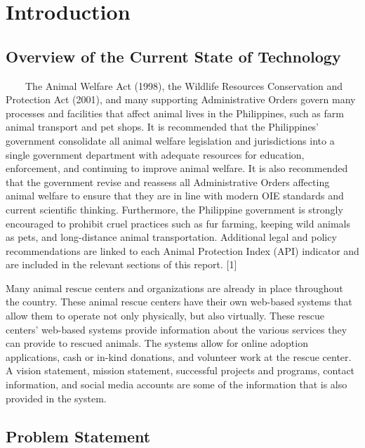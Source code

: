 \chapter{Introduction}
\label{sec:researchdesc}    %

\section{Overview of the Current State of Technology}
\label{sec:overview}

~~~~The Animal Welfare Act (1998), the Wildlife Resources Conservation and Protection Act (2001), and many supporting Administrative Orders govern many processes and facilities that affect animal lives in the Philippines, such as farm animal transport and pet shops. It is recommended that the Philippines' government consolidate all animal welfare legislation and jurisdictions into a single government department with adequate resources for education, enforcement, and continuing to improve animal welfare. It is also recommended that the government revise and reassess all Administrative Orders affecting animal welfare to ensure that they are in line with modern OIE standards and current scientific thinking. Furthermore, the Philippine government is strongly encouraged to prohibit cruel practices such as fur farming, keeping wild animals as pets, and long-distance animal transportation. Additional legal and policy recommendations are linked to each Animal Protection Index (API) indicator and are included in the relevant sections of this report. [1] 

Many animal rescue centers and organizations are already in place throughout the country. These animal rescue centers have their own web-based systems that allow them to operate not only physically, but also virtually. These rescue centers' web-based systems provide information about the various services they can provide to rescued animals. The systems allow for online adoption applications, cash or in-kind donations, and volunteer work at the rescue center. A vision statement, mission statement, successful projects and programs, contact information, and social media accounts are some of the information that is also provided in the system.



\section{Problem Statement}

